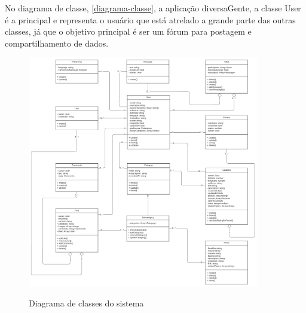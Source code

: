 No diagrama de classe, \autoref{diagrama-classe}, a aplicação diversaGente, a classe User é a principal e representa o usuário que está atrelado a grande parte das outras classes, já que o objetivo principal é ser um fórum para postagem e compartilhamento de dados. 

\pagebreak

\begin{figure}[htb]
	\centering
	\caption{\label{fig_arq_virado}Diagrama de classes do sistema}
	\includegraphics[width=0.90\textwidth]{anexos/diversaGente_-_Classe_UML_1.png}
	\label{diagrama-classe}
\end{figure}
